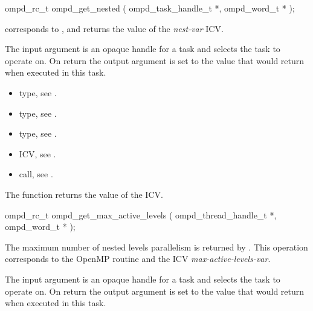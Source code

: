 \format
\begin{cspecific}
\begin{ompSyntax}
ompd_rc_t ompd_get_nested (
  ompd_task_handle_t *,
  ompd_word_t *
);
\end{ompSyntax}
\end{cspecific}

\descr
{} corresponds to ,
and returns the value of the \emph{nest-var} ICV.

\argdesc
The input argument  is an opaque handle for a task and selects the task to operate on.
On return the output argument  is set to the value that  would return when
executed in this task.

\crossreferences
\begin{itemize}
  \item {} type, see .
	\item {} type, see .
	\item {} type, see .
	\item {} ICV, see .
	\item {} call, see .
\end{itemize}


\label{subsubsubsec:ompd_get_max_active_levels}
\summary
The  function returns the value of the  ICV.

\format
\begin{cspecific}
\begin{ompSyntax}
ompd_rc_t ompd_get_max_active_levels (
  ompd_thread_handle_t *,
  ompd_word_t *
);
\end{ompSyntax}
\end{cspecific}

\descr
The maximum number of nested levels parallelism is returned by
.
This operation corresponds to the OpenMP routine
and the ICV \emph{max-active-levels-var}.%

\argdesc
The input argument  is an opaque handle for a task and selects the task to operate on.
On return the output argument  is set to the value that  would return when
executed in this task.

